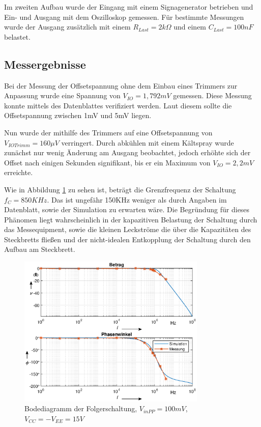 Im zweiten Aufbau wurde der Eingang mit einem Signagenerator betrieben und Ein- und Ausgang mit dem Oszilloskop gemessen. Für bestimmte Messungen wurde der Ausgang zusätzlich mit einem $R_{Last} = 2k\Omega$ und einem $C_{Last} = 100nF$ belastet.


\subsection{Messergebnisse}
Bei der Messung der Offsetspannung ohne dem Einbau eines Trimmers zur Anpassung wurde eine Spannung von $V_{IO} = 1,792 mV$ gemessen. Diese Messung konnte mittels des Datenblattes verifiziert werden. Laut diesem sollte die Offsetspannung zwischen 1mV und 5mV liegen.\cite[6]{ti:ua741}

Nun wurde der mithilfe des Trimmers auf eine Offsetspannung von $V_{IO Trimm} = 160 \mu V$ verringert. Durch abkühlen mit einem Kältspray wurde zunächst nur wenig Änderung am Ausgang beobachtet, jedoch erhöhte sich der Offset nach einigen Sekunden signifikant, bis er ein Maximum von $V_{IO} = 2,2mV$ erreichte. 

Wie in Abbildung \ref{fig:Bode_Folger_ua741} zu sehen ist, beträgt die Grenzfrequenz der Schaltung $f_C=850KHz$. Das ist ungefähr 150KHz weniger als durch Angaben im Datenblatt, sowie der Simulation zu erwarten wäre. Die Begründung für dieses Phänomen liegt wahrscheinlich in der kapazitiven Belastung der Schaltung durch das Messequipment, sowie die kleinen Leckströme die über die Kapazitäten des Steckbretts fließen und der nicht-idealen Entkopplung der Schaltung durch den Aufbau am Steckbrett. 

\begin{figure}[H]
    \centering
    \includegraphics[width=0.8\textwidth]{Lab_1/Plots/Folger.eps}
    \caption{Bodediagramm der Folgerschaltung, $V_{inPP}=100mV$, $V_{CC}=-V_{EE}=15V$}
    \label{fig:Bode_Folger_ua741}
\end{figure}

